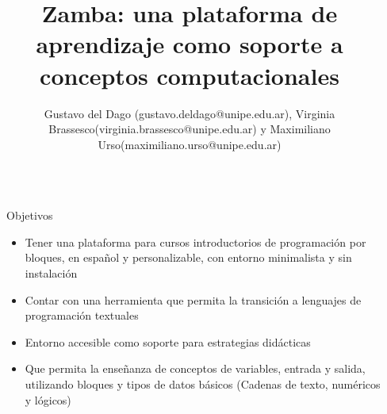 \documentclass[final]{beamer}
\title{Zamba: una plataforma de aprendizaje como soporte a conceptos computacionales} %
\author{Gustavo del Dago (gustavo.deldago@unipe.edu.ar), Virginia Brassesco(virginia.brassesco@unipe.edu.ar) y Maximiliano Urso(maximiliano.urso@unipe.edu.ar)}
\institute{Universidad Pedagógica Nacional} %
\newlength{\sepwid}
\newlength{\twocolwid}
\begin{document}

\setlength{\belowcaptionskip}{2ex} %
\setlength\belowdisplayshortskip{2ex} %

\begin{frame}[t] %

\begin{columns}[t] %

\begin{column}{\sepwid}\end{column} %

\begin{column}{\twocolwid} %


\begin{alertblock}{Objetivos}
    \begin{itemize}
        \item Tener una plataforma para cursos introductorios de programación por bloques, en español y personalizable, con entorno minimalista y sin instalación              
        \item Contar con una herramienta que permita la transición a lenguajes de programación textuales
        \item Entorno accesible como soporte para estrategias didácticas
        \item Que permita la enseñanza de conceptos de  variables, entrada y salida, utilizando bloques y tipos de datos básicos (Cadenas de texto, numéricos y lógicos)
    \end{itemize}
\end{alertblock}



\end{column}
\end{columns}
\end{frame}
\end{document}

